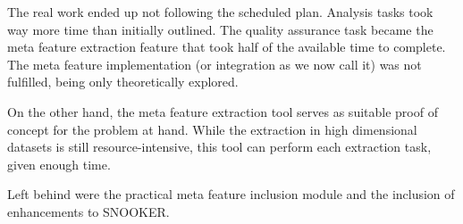 The real work ended up not following the scheduled plan. Analysis tasks took way more time than initially outlined. The quality assurance task became the meta feature extraction feature that took half of the available time to complete. The meta feature implementation (or integration as we now call it) was not fulfilled, being only theoretically explored.

On the other hand, the meta feature extraction tool serves as suitable proof of concept for the problem at hand. While the extraction in high dimensional datasets is still resource-intensive, this tool can perform each extraction task, given enough time.

Left behind were the practical meta feature inclusion module and the inclusion of enhancements to SNOOKER.